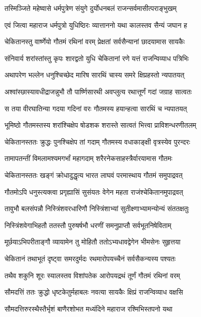 \twolineshloka
{तस्मिञ्जिते महेष्वासे धर्मपुत्रेण संयुगे}
{दुर्योधनबलं राजन्सर्वमासीत्पराङ्भुखम्}


\twolineshloka
{एवं जित्वा महाराज धर्मपुत्रो युधिष्ठिरः}
{व्यात्ताननो यथा कालस्तव सैन्यं जघान ह}


\twolineshloka
{चेकितानस्तु वार्ष्णेयो गौतमं रथिनां वरम्}
{प्रेक्षतां सर्वसैन्यानां छादयामास सायकैः}


\twolineshloka
{संनिवार्य शरांस्तांस्तु कृपः शारद्वतो युधि}
{चेकितानां रणे यत्तं राजन्विव्याध पत्रिभिः}


\twolineshloka
{अथापरेण भल्लेन धनुश्चिच्छेद मारिष}
{सारथिं चास्य समरे क्षिप्रहस्तो न्यपातयत्}


\twolineshloka
{अश्वांस्छास्यावधीद्राजन्नुभौ तौ पार्ष्णिसारथी}
{अवप्लुत्य रथात्तूर्णं गदां जग्राह सात्वतः}


\twolineshloka
{स तया वीरघातिन्या गदया गदिनां वरः}
{गौतमस्य हयान्हत्वा सारथिं च न्यपातयत्}


\twolineshloka
{भूमिष्ठो गौतमस्तस्य शरांश्चिक्षेप षोडशक}
{शरास्ते सात्वतं भित्त्वा प्राविशन्धरणीतलम्}


\twolineshloka
{चेकितानस्ततः क्रुद्धः पुनश्चिक्षेप तां गदाम्}
{गौतमस्य वधाकाङ्क्षी वृत्रस्येव पुरन्दरः}


\twolineshloka
{तामापतन्तीं विमलामश्यमगर्भां महागदाम्}
{शरैरनेकसाहस्त्रैर्वारयामास गौतमः}


\twolineshloka
{चेकितानस्ततः खङ्गं क्रोधादुद्धृत्य भारत}
{लाघवं परमास्थाय गौतमं समुपाद्रवत्}


\twolineshloka
{गौतमोऽपि धनुस्त्यक्त्वा प्रगृह्यासिं सुसंयतः}
{वेगेन महता राजंश्चेकितानमुपाद्रवत्}


\twolineshloka
{तावुभौ बलसंपन्नौ निस्त्रिंशवरधारिणौ}
{निस्त्रिंशाभ्यां सुतीक्ष्णाभ्यामन्योन्यं संततक्षतुः}


\twolineshloka
{निस्त्रिंशवेगाभिहतौ ततस्तौ पुरुषर्षभौ}
{धरणीं समनुप्राप्तौ सर्वभूतनिषेविताम्}


\twolineshloka
{मूर्छयाऽभिपरीताङ्गौ व्यायामेन तु मोहितौ}
{ततोऽभ्यधावद्वेगेन भीमसेनः सुहृत्तया}


\twolineshloka
{चेकितानं तथाभूतं दृष्ट्वा समरदुर्मदः}
{रथमारोपयच्चैनं सर्वसैकन्यस्य पश्यतः}


\twolineshloka
{तथैव शकुनि शूरः स्यालस्तव विशांपतेक}
{आरोपयद्रथं तूर्णं गौतमं रथिनां वरम्}


\twolineshloka
{सौमदत्तिं ततः क्रुद्धो धृष्टकेतुर्महाबलः}
{नवत्या सायकैः क्षिप्रं राजन्विव्याध वक्षसि}


\twolineshloka
{सौमदत्तिरुरस्थैस्तैर्भृशं बाणैरशोभत}
{मध्यंदिने महाराज रश्मिभिस्तपनो यथा}


